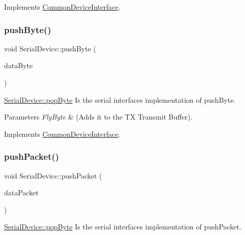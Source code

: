 Implements \hyperlink{class_common_device_interface}{Common\+Device\+Interface}.

\hypertarget{class_serial_device_a8ae456ccffcf8afccdfe49357aed3e06}{}\label{class_serial_device_a8ae456ccffcf8afccdfe49357aed3e06} 
\subsubsection{\texorpdfstring{push\+Byte()}{pushByte()}}
{\footnotesize\ttfamily void Serial\+Device\+::push\+Byte (\begin{DoxyParamCaption}\item[{Fly\+Byte}]{data\+Byte }\end{DoxyParamCaption})\hspace{0.3cm}{\ttfamily [virtual]}}



\hyperlink{class_serial_device_aa48df17f28ab9f613ba07181487a39c9}{Serial\+Device\+::pop\+Byte} Is the serial interface\textquotesingle{}s implementation of push\+Byte. 


\begin{DoxyParams}{Parameters}
{\em Fly\+Byte} & (Adds it to the TX Transmit Buffer). \\
\hline
\end{DoxyParams}


Implements \hyperlink{class_common_device_interface}{Common\+Device\+Interface}.

\hypertarget{class_serial_device_a35408d01afb4c48bc259dc601d2b0bf7}{}\label{class_serial_device_a35408d01afb4c48bc259dc601d2b0bf7} 
\subsubsection{\texorpdfstring{push\+Packet()}{pushPacket()}}
{\footnotesize\ttfamily void Serial\+Device\+::push\+Packet (\begin{DoxyParamCaption}\item[{\hyperlink{class_fly_packet}{Fly\+Packet}}]{data\+Packet }\end{DoxyParamCaption})\hspace{0.3cm}{\ttfamily [virtual]}}



\hyperlink{class_serial_device_aa48df17f28ab9f613ba07181487a39c9}{Serial\+Device\+::pop\+Byte} Is the serial interface\textquotesingle{}s implementation of push\+Packet. 


